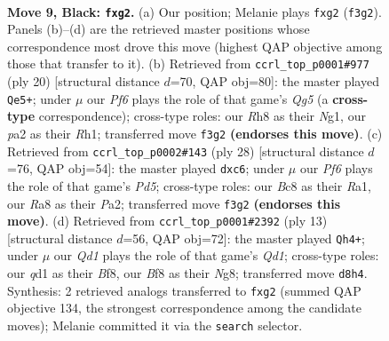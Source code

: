 \documentclass[11pt]{article}
\begin{document}
\clearpage

\begin{figure}[p]\centering
\begin{subfigure}{0.46\textwidth}\centering
\resizebox{\linewidth}{!}{%
\newchessgame
\chessboard[
  setfen={r1bqkb1r/ppp2ppp/2P5/8/8/5p2/PPP2PPP/RNBQK2R b KQkq - 0 9},
  showmover=false,
  pgfstyle=straightmove, color=movearrow, markmove={f3-g2}
]}
\caption{}
\end{subfigure}\hfill
\begin{subfigure}{0.46\textwidth}\centering
\resizebox{\linewidth}{!}{%
\newchessgame
\chessboard[
  setfen={r1bqk2r/ppp2ppp/5P2/n5Q1/1b6/2p5/PPP1BPPP/R1B1K1NR w KQkq - 1 11},
  showmover=false,
  pgfstyle=straightmove, color=movearrow, markmove={g5-e5}
]}
\caption{}
\end{subfigure}
\\[4pt]
\begin{subfigure}{0.46\textwidth}\centering
\resizebox{\linewidth}{!}{%
\newchessgame
\chessboard[
  setfen={r1b1k2r/5ppp/p1p2n2/2qPp3/8/8/PP1B1PPP/R2QKB1R w KQkq - 0 15},
  showmover=false,
  pgfstyle=straightmove, color=movearrow, markmove={d5-c6}
]}
\caption{}
\end{subfigure}\hfill
\begin{subfigure}{0.46\textwidth}\centering
\resizebox{\linewidth}{!}{%
\newchessgame
\chessboard[
  setfen={r1bqkbnr/pppp1p1p/2P5/8/4Pp2/5Q2/PPP3PP/RNB1KB1R b KQkq - 0 7},
  showmover=false,
  pgfstyle=straightmove, color=movearrow, markmove={d8-h4}
]}
\caption{}
\end{subfigure}
\caption{\textbf{Move 9, Black: \texttt{fxg2}.} (a) Our position; Melanie plays \texttt{fxg2} (\texttt{f3g2}). Panels (b)--(d) are the retrieved master positions whose correspondence most drove this move (highest QAP objective among those that transfer to it). (b) Retrieved from \texttt{ccrl\_top\_p0001\#977} (ply 20) [structural distance $d$=70, QAP obj=80]: the master played \texttt{Qe5+}; under $\mu$ our \emph{Pf6} plays the role of that game's \emph{Qg5} (a \textbf{cross-type} correspondence); cross-type roles: our \emph{R}h8 as their \emph{N}g1, our \emph{p}a2 as their \emph{R}h1; transferred move \texttt{f3g2} \textbf{(endorses this move)}. (c) Retrieved from \texttt{ccrl\_top\_p0002\#143} (ply 28) [structural distance $d$=76, QAP obj=54]: the master played \texttt{dxc6}; under $\mu$ our \emph{Pf6} plays the role of that game's \emph{Pd5}; cross-type roles: our \emph{B}c8 as their \emph{R}a1, our \emph{R}a8 as their \emph{P}a2; transferred move \texttt{f3g2} \textbf{(endorses this move)}. (d) Retrieved from \texttt{ccrl\_top\_p0001\#2392} (ply 13) [structural distance $d$=56, QAP obj=72]: the master played \texttt{Qh4+}; under $\mu$ our \emph{Qd1} plays the role of that game's \emph{Qd1}; cross-type roles: our \emph{q}d1 as their \emph{B}f8, our \emph{B}f8 as their \emph{N}g8; transferred move \texttt{d8h4}. Synthesis: 2 retrieved analogs transferred to \texttt{fxg2} (summed QAP objective 134, the strongest correspondence among the candidate moves); Melanie committed it via the \texttt{search} selector.}
\label{fig:thought-m17}
\end{figure}
\end{document}

